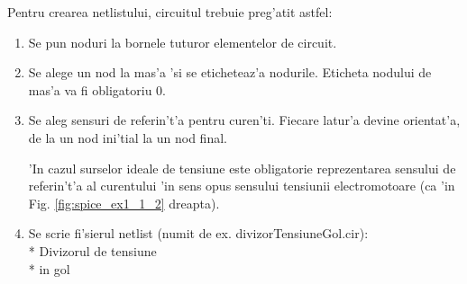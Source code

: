 Pentru crearea netlistului, circuitul trebuie preg'atit astfel:
\begin{enumerate}
\item Se pun noduri la bornele tuturor elementelor de circuit.
\item Se alege un nod la mas'a 'si se eticheteaz'a nodurile. Eticheta nodului de mas'a va fi obligatoriu 0.
\item Se aleg sensuri de referin't'a pentru curen'ti. Fiecare latur'a devine orientat'a, de la un nod ini'tial la un nod final.

\begin{retine}
  \label{retine3_1}
  \index{}
    'In cazul surselor ideale de tensiune este obligatorie reprezentarea sensului de referin't'a al curentului 'in sens opus sensului tensiunii electromotoare (ca 'in Fig. \ref{fig:spice_ex1_1_2} dreapta).
\end{retine}


\item Se scrie fi'sierul netlist (numit de ex. divizorTensiuneGol.cir): \\
\textcolor{OliveGreen}{* Divizorul de tensiune} \\
\textcolor{OliveGreen}{* in gol}


\end{enumerate}
